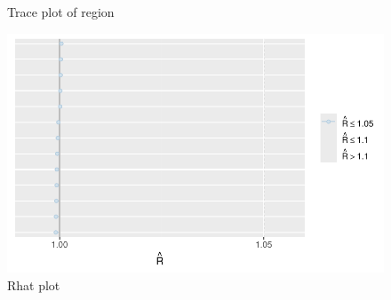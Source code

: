 \documentclass[
  letterpaper,
  DIV=11,
  numbers=noendperiod]{scrartcl}
\begin{document}
\begin{figure}
\begin{minipage}[t]{0.50\linewidth}
{}

\end{minipage}%
\newline
\begin{minipage}[t]{0.50\linewidth}

{\centering 


}

\end{minipage}%

\caption{\label{fig-trace3}Trace plot of region}

\end{figure}

\begin{figure}

{\centering \includegraphics{paper_files/figure-pdf/fig-rhat-1.pdf}

}

\caption{\label{fig-rhat}Rhat plot}

\end{figure}
\end{document}
